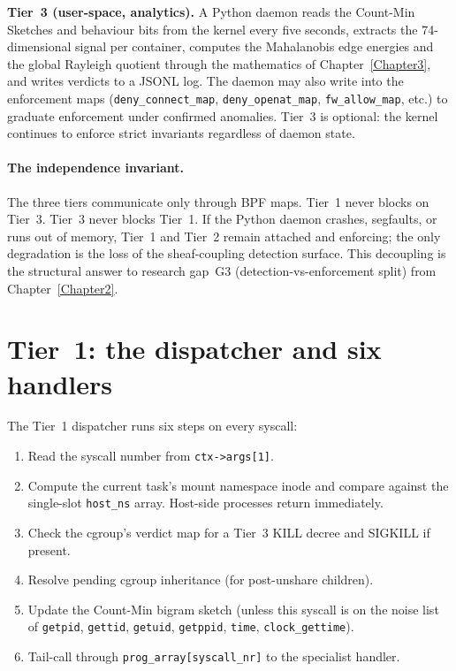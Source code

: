 \textbf{Tier~3 (user-space, analytics).} A Python daemon reads the
Count-Min Sketches and behaviour bits from the kernel every five seconds,
extracts the 74-dimensional signal per container, computes the Mahalanobis
edge energies and the global Rayleigh quotient through the mathematics of
Chapter~\ref{Chapter3}, and writes verdicts to a JSONL log. The daemon may
also write into the enforcement maps (\texttt{deny\_connect\_map},
\texttt{deny\_openat\_map}, \texttt{fw\_allow\_map}, etc.) to graduate
enforcement under confirmed anomalies. Tier~3 is optional: the kernel
continues to enforce strict invariants regardless of daemon state.

\paragraph{The independence invariant.} The three tiers communicate only
through BPF maps. Tier~1 never blocks on Tier~3. Tier~3 never blocks
Tier~1. If the Python daemon crashes, segfaults, or runs out of memory,
Tier~1 and Tier~2 remain attached and enforcing; the only degradation is
the loss of the sheaf-coupling detection surface. This decoupling is the
structural answer to research gap~G3 (detection-vs-enforcement split) from
Chapter~\ref{Chapter2}.

\section{Tier~1: the dispatcher and six handlers}
\label{sec:tier1}

The Tier~1 dispatcher runs six steps on every syscall:

\begin{enumerate}
  \item Read the syscall number from \texttt{ctx->args[1]}.
  \item Compute the current task's mount namespace inode and compare against
    the single-slot \texttt{host\_ns} array. Host-side processes return
    immediately.
  \item Check the cgroup's verdict map for a Tier~3 KILL decree and
    SIGKILL if present.
  \item Resolve pending cgroup inheritance (for post-unshare children).
  \item Update the Count-Min bigram sketch (unless this syscall is on the
    noise list of \texttt{getpid}, \texttt{gettid}, \texttt{getuid},
    \texttt{getppid}, \texttt{time}, \texttt{clock\_gettime}).
  \item Tail-call through \texttt{prog\_array[syscall\_nr]} to the
    specialist handler.
\end{enumerate}

